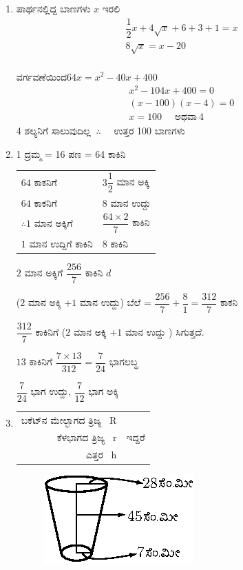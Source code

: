 \begin{enumerate}
\item ಪಾರ್ಥನಲ್ಲಿದ್ದ ಬಾಣಗಳು $x$ ಇರಲಿ 
\begin{gather*}
\dfrac{1}{2}x + 4\sqrt{x} + 6 + 3 + 1 = x\\
8\sqrt{x} = x - 20\\
\end{gather*}

ವರ್ಗವಣೆಯಿಂದ\quad $64x = x^{2} - 40x + 400$
\begin{gather*}
x^{2} - 104x + 400 = 0\\
(x - 100) (x - 4) = 0\\
x = 100 \quad\text{ ಅಥವಾ}~ 4
\end{gather*}
4 ಶಲ್ಯನಿಗೆ ಸಾಲುವುದಿಲ್ಲ $~\therefore\quad$ ಉತ್ತರ 100 ಬಾಣಗಳು 

\item 1 ದ್ರಮ್ಮ = 16 ಪಣ =  64 ಕಾಕಿನಿ 

\begin{tabular}[t]{ll}
$64$ ಕಾಕನಿಗೆ & $3\dfrac{1}{2}$ ಮಾನ ಅಕ್ಕಿ \\
$64$ ಕಾಕನಿಗೆ & $8$ ಮಾನ ಉದ್ದು \\[0.3cm]
$\therefore 1$ ಮಾನ ಅಕ್ಕಿಗೆ & $\dfrac{64\times 2}{7}$ ಕಾಕಿನಿ\\
$1$ ಮಾನ ಉದ್ದಿಗೆ ಕಾಕಿನಿ  & $8$ ಕಾಕಿನಿ 
\end{tabular}

$2$ ಮಾನ ಅಕ್ಕಿಗೆ $\dfrac{256}{7}$ ಕಾಕಿನಿ $d$

($2$ ಮಾನ ಅಕ್ಕಿ $+ 1$ ಮಾನ ಉದ್ದು) ಬೆಲೆ = $\dfrac{256}{7} + \dfrac{8}{1} = \dfrac{312}{7}$ ಕಾಕನಿ 

$\dfrac{312}{7}$ ಕಾಕಿನಿಗೆ ($2$ ಮಾನ ಅಕ್ಕಿ $+ 1$ ಮಾನ ಉದ್ದು ) ಸಿಗುತ್ತದೆ. 

$13$ ಕಾಕಿನಿಗೆ  $\dfrac{7\times 13}{312} = \dfrac{7}{24}$ ಭಾಗಲಬ್ಧ 

$\dfrac{7}{24}$ ಭಾಗ ಉದ್ದು, $\dfrac{7}{12}$ ಭಾಗ ಅಕ್ಕಿ 

\item 
\begin{tabular}[t]{rl}
ಬಕೆಟ್‌ನ ಮೇಲ್ಭಾಗದ ತ್ರಿಜ್ಯ  ~R & \\
ಕೆಳಭಾಗದ ತ್ರಿಜ್ಯ ~r & ಇದ್ದರೆ \\
ಎತ್ತರ ~h & 
\end{tabular}

\begin{figure}[H]
\centering
\includegraphics{images/chap10/ans23.eps}
\end{figure}


\end{enumerate}
